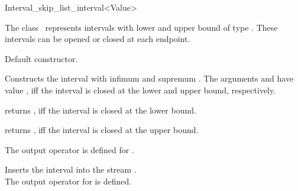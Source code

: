 \begin{ccRefClass} {Interval_skip_list_interval<Value>}

\ccDefinition

The class \ccClassTemplateName\ represents intervals with lower and upper
bound of type . These intervals
 can be opened or closed at each endpoint.


\ccThreeToTwo



\ccCreation
{}

{Default constructor.}

{Constructs the interval with infimum  and supremum .
The arguments  and  have value , iff
the interval is closed at the lower and upper bound, respectively.}

\ccOperations


{returns , iff the interval is closed at the lower bound.}

{returns , iff the interval is closed at the upper bound.}


The output operator is defined for .

{Inserts the interval  into the stream .\\
\ccPrecond The output operator for  is defined.}


\ccIsModel
{}

\end{ccRefClass}

